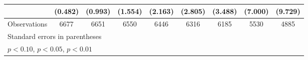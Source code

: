 \begin{table}[htbp]
\begin{tabular}{l*{8}{c}}
                    &     (0.482)         &     (0.993)         &     (1.554)         &     (2.163)         &     (2.805)         &     (3.488)         &     (7.000)         &     (9.729)         \\
\hline
Observations        &        6677         &        6651         &        6550         &        6446         &        6316         &        6185         &        5530         &        4885         \\
\hline\hline
\multicolumn{9}{l}{\footnotesize Standard errors in parentheses}\\
\multicolumn{9}{l}{\footnotesize \sym{*} \(p<0.10\), \sym{**} \(p<0.05\), \sym{***} \(p<0.01\)}\\
\end{tabular}
\end{table}
